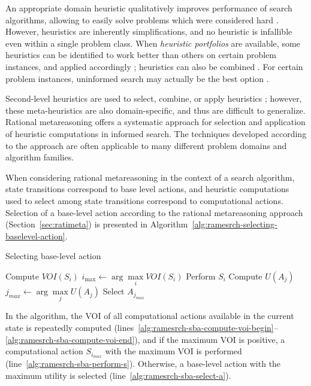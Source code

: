 An appropriate domain heuristic qualitatively improves performance of
search algorithms, allowing to easily solve problems which were
considered hard \cite{Allen.selheur}. However, heuristics are
inherently simplifications, and no heuristic is infallible even within
a single problem class. When {\em heuristic portfolios} are available,
some heuristics can be identified to work better than others on
certain problem instances, and applied accordingly
\cite{Allen.selheur}; heuristics can also be combined
\cite{Domshlak.combine}. For certain problem instances, uninformed
search may actually be the best option \cite{Kask.solcount}.

Second-level heuristics are used to select, combine, or apply
heuristics \cite{Allen.selheur}\cite{Bulitko.dynamiccontrol}; however,
these meta-heuristics are also domain-specific, and thus are difficult
to generalize. Rational metareasoning offers a systematic approach for
selection and application of heuristic computations in informed search. The
techniques developed according to the approach are often applicable to
many different problem domains and algorithm families.

When considering rational metareasoning in the context of a search
algorithm, state transitions correspond to base level actions, and
heuristic computations used to select among state transitions
correspond to computational actions. Selection of a base-level action
according to the rational metareasoning approach
(Section~\ref{sec:ratimeta}) is presented in
Algorithm~\ref{alg:ramesrch-selecting-baselevel-action}.
\begin{algorithm}
  \caption{Selecting base-level action}
  \label{alg:ramesrch-selecting-baselevel-action}
  \begin{algorithmic}[1]
    \LOOP                                    \label{alg:ramesrch-sba-compute-voi-begin}
        \STATE Compute $VOI(S_i)$            \label{alg:ramesrch-sba-compute-voi}
      \ENDFOR
      \STATE $i_{\max} \leftarrow \arg \max\limits_i VOI(S_i)$
         \STATE Perform $S_i$                \label{alg:ramesrch-sba-perform-s}
      \ELSE
      \ENDIF
    \ENDLOOP                                 \label{alg:ramesrch-sba-compute-voi-end}
       \STATE Compute $U(A_j)$
    \ENDFOR
    \STATE $j_{max} \leftarrow \arg \max \limits_j U(A_j)$
    \STATE Select $A_{j_{max}}$              \label{alg:ramesrch-sba-select-a}
  \end{algorithmic}
\end{algorithm}
In the algorithm, the VOI of all computational actions available in
the current state is repeatedly computed
(lines~\ref{alg:ramesrch-sba-compute-voi-begin}--\ref{alg:ramesrch-sba-compute-voi-end}),
and if the maximum VOI is positive, a computational action
$S_{i_{max}}$ with the maximum VOI is performed
(line~\ref{alg:ramesrch-sba-perform-s}). Otherwise, a base-level
action with the maximum utility is selected
(line~\ref{alg:ramesrch-sba-select-a}).

